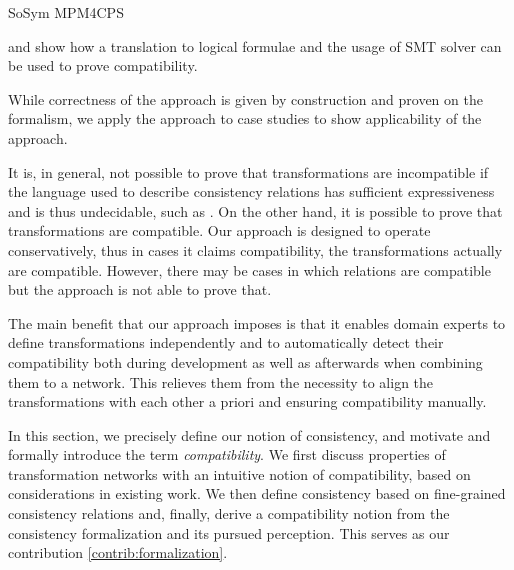 \begin{copiedFrom}{SoSym MPM4CPS}
\begin{description}[leftmargin=\parindent]
    \qvtr and show how a translation to logical formulae and the usage of SMT solver can be used to prove compatibility.
    \item[\contributionlabel{contrib:evaluation}{Applicability Evaluation}{C4}:] While correctness of the approach is given by construction and proven on the formalism, we apply the approach to case studies to show applicability of the approach. 
\end{description}
It is, in general, not possible to prove that transformations are incompatible if the language used to describe consistency relations has sufficient expressiveness and is thus undecidable, such as \qvtr.
On the other hand, it is possible to prove that transformations are compatible.
Our approach is designed to operate conservatively, thus in cases it claims compatibility, the transformations actually are compatible.
However, there may be cases in which relations are compatible but the approach is not able to prove that.
    
The main benefit that our approach imposes is that it enables domain experts to define transformations independently and %
to automatically detect their compatibility both during development as well as afterwards when combining them to a network.
This relieves them from the necessity to align the transformations with each other a priori and ensuring compatibility manually.



In this section, we precisely define our notion of consistency, and motivate and formally introduce the term \emph{compatibility}.
We first discuss properties of transformation networks %
with an intuitive notion of compatibility, based on considerations in existing work.
We then define consistency based on fine-grained consistency relations and,
finally, derive a compatibility notion from the consistency formalization and its pursued perception.
This serves as our contribution \ref{contrib:formalization}.


\end{copiedFrom}
